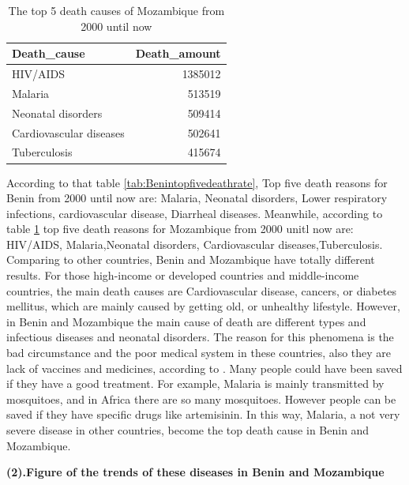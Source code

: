 \documentclass[11pt,a4paper,]{article}
\begin{document}
\begin{table}

\caption{\label{tab:Mozambiquetopfivedeathrate}The top 5 death causes of Mozambique from 2000 until now}
\centering
\begin{tabular}[t]{l|r}
\hline
Death\_cause & Death\_amount\\
\hline
HIV/AIDS & 1385012\\
\hline
Malaria & 513519\\
\hline
Neonatal disorders & 509414\\
\hline
Cardiovascular diseases & 502641\\
\hline
Tuberculosis & 415674\\
\hline
\end{tabular}
\end{table}

According to that table \ref{tab:Benintopfivedeathrate}, Top five death reasons for Benin from 2000 until now are: Malaria, Neonatal disorders, Lower respiratory infections, cardiovascular disease, Diarrheal diseases. Meanwhile, according to table \ref{tab:Mozambiquetopfivedeathrate} top five death reasons for Mozambique from 2000 unitl now are: HIV/AIDS, Malaria,Neonatal disorders, Cardiovascular diseases,Tuberculosis. Comparing to other countries, Benin and Mozambique have totally different results. For those high-income or developed countries and middle-income countries, the main death causes are Cardiovascular disease, cancers, or diabetes mellitus, which are mainly caused by getting old, or unhealthy lifestyle. However, in Benin and Mozambique the main cause of death are different types and infectious diseases and neonatal disorders. The reason for this phenomena is the bad circumstance and the poor medical system in these countries, also they are lack of vaccines and medicines, according to \textcite{mbaye2019telling}. Many people could have been saved if they have a good treatment. For example, Malaria is mainly transmitted by mosquitoes, and in Africa there are so many mosquitoes. However people can be saved if they have specific drugs like artemisinin. In this way, Malaria, a not very severe disease in other countries, become the top death cause in Benin and Mozambique.

\textbf{(2).Figure of the trends of these diseases in Benin and Mozambique}
\end{document}
